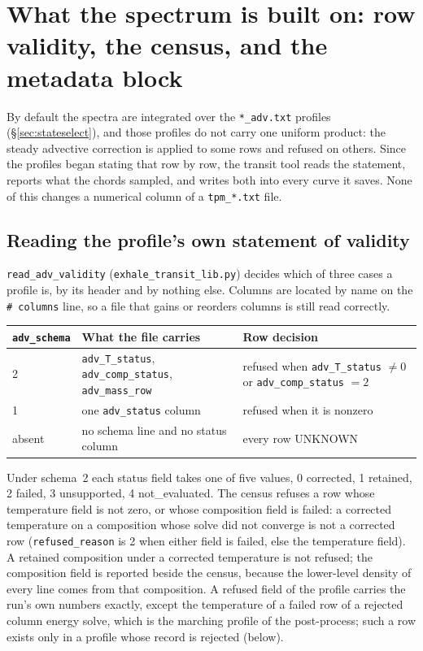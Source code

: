 \documentclass[english,a4paper]{my_memo}
\begin{document}
\section{What the spectrum is built on: row validity, the census, and the
         metadata block}
\label{sec:validity}

By default the spectra are integrated over the \verb|*_adv.txt| profiles
(\S\ref{sec:stateselect}), and those
profiles do not carry one uniform product: the steady advective correction
is applied to some rows and refused on others. Since the profiles began
stating that row by row, the transit tool reads the statement, reports what
the chords sampled, and writes both into every curve it saves. None of this
changes a numerical column of a \verb|tpm_*.txt| file.

\subsection{Reading the profile's own statement of validity}
\label{sec:advvalidity}

\verb|read_adv_validity| (\verb|exhale_transit_lib.py|) decides which of
three cases a profile is, by its header and by nothing else. Columns are
located by name on the \verb|# columns| line, so a file that gains or
reorders columns is still read correctly.

\begin{center}\small
\begin{tabular}{@{}lll@{}}
\toprule
\verb|adv_schema| & What the file carries & Row decision \\
\midrule
2 & \verb|adv_T_status|, \verb|adv_comp_status|, \verb|adv_mass_row|
  & refused when \verb|adv_T_status| $\neq 0$ or \verb|adv_comp_status| $= 2$ \\
1 & one \verb|adv_status| column & refused when it is nonzero \\
absent & no schema line and no status column & every row UNKNOWN \\
\bottomrule
\end{tabular}
\end{center}

Under schema~2 each status field takes one of five values, 0 corrected,
1 retained, 2 failed, 3 unsupported, 4 not\_evaluated. The census refuses a
row whose temperature field is not zero, or whose composition field is
failed: a corrected temperature on a composition whose solve did not
converge is not a corrected row (\verb|refused_reason| is 2 when either field
is failed, else the temperature field). A retained composition under a
corrected temperature is not refused; the composition field is reported
beside the census, because the lower-level density of every line comes from
that composition. A refused field of the profile carries the run's own
numbers exactly, except the temperature of a failed row of a rejected column
energy solve, which is the marching profile of the post-process; such a row
exists only in a profile whose record is rejected (below).
\end{document}
